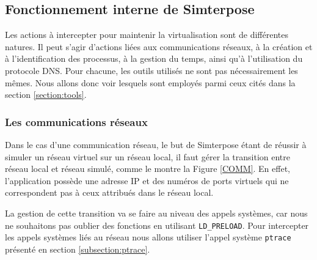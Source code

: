 \subsection{Fonctionnement interne de Simterpose}
\label{subsection:fonctionnement_simterpose}

Les actions à intercepter pour maintenir la virtualisation sont de différentes
natures. Il peut s'agir d'actions liées aux communications réseaux, à la
création et à l'identification des processus, à la gestion du temps, ainsi qu'à
l'utilisation du protocole DNS. Pour chacune, les outils utilisés ne sont pas
nécessairement les mêmes. Nous allons donc voir lesquels sont employés parmi
ceux cités dans la section \ref{section:tools}.

\subsubsection{Les communications réseaux}
\label{subsubsection:fonctionnement_reseau}

Dans le cas d'une communication réseau, le but de Simterpose étant de réussir à
simuler un réseau virtuel sur un réseau local, il faut gérer la transition entre
réseau local et réseau simulé, comme le montre la Figure \ref{COMM}. En effet,
l'application possède une adresse IP et des numéros de ports virtuels qui ne
correspondent pas à ceux attribués dans le réseau local.

La gestion de cette transition va se faire au niveau des appels systèmes, car nous ne souhaitons pas oublier des fonctions en utilisant \texttt{LD\_PRELOAD}. Pour intercepter les appels systèmes liés au réseau nous allons utiliser l'appel système \texttt{ptrace} présenté en section \ref{subsection:ptrace}.

